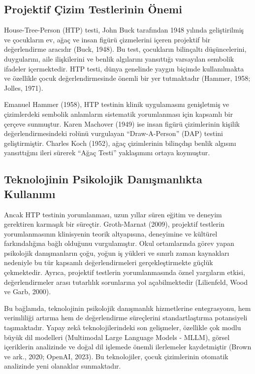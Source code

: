\subsection{Projektif Çizim Testlerinin Önemi}

House-Tree-Person (HTP) testi, John Buck tarafından 1948 yılında geliştirilmiş ve çocukların ev, ağaç ve insan figürü çizmelerini içeren projektif bir değerlendirme aracıdır (Buck, 1948). Bu test, çocukların bilinçaltı düşüncelerini, duygularını, aile ilişkilerini ve benlik algılarını yansıttığı varsayılan sembolik ifadeler içermektedir. HTP testi, dünya genelinde yaygın biçimde kullanılmakta ve özellikle çocuk değerlendirmesinde önemli bir yer tutmaktadır (Hammer, 1958; Jolles, 1971).

Emanuel Hammer (1958), HTP testinin klinik uygulamasını genişletmiş ve çizimlerdeki sembolik anlamların sistematik yorumlanması için kapsamlı bir çerçeve sunmuştur. Karen Machover (1949) ise insan figürü çizimlerinin kişilik değerlendirmesindeki rolünü vurgulayan ``Draw-A-Person'' (DAP) testini geliştirmiştir. Charles Koch (1952), ağaç çizimlerinin bilinçdışı benlik algısını yansıttığını ileri sürerek ``Ağaç Testi'' yaklaşımını ortaya koymuştur.

\subsection{Teknolojinin Psikolojik Danışmanlıkta Kullanımı}

Ancak HTP testinin yorumlanması, uzun yıllar süren eğitim ve deneyim gerektiren karmaşık bir süreçtir. Groth-Marnat (2009), projektif testlerin yorumlanmasının klinisyenin teorik altyapısına, deneyimine ve kültürel farkındalığına bağlı olduğunu vurgulamıştır. Okul ortamlarında görev yapan psikolojik danışmanların çoğu, yoğun iş yükleri ve sınırlı zaman kaynakları nedeniyle bu tür kapsamlı değerlendirmeleri gerçekleştirmekte güçlük çekmektedir. Ayrıca, projektif testlerin yorumlanmasında öznel yargıların etkisi, değerlendirmeler arası tutarlılık sorunlarına yol açabilmektedir (Lilienfeld, Wood ve Garb, 2000).

Bu bağlamda, teknolojinin psikolojik danışmanlık hizmetlerine entegrasyonu, hem verimliliği artırma hem de değerlendirme süreçlerini standartlaştırma potansiyeli taşımaktadır. Yapay zekâ teknolojilerindeki son gelişmeler, özellikle çok modlu büyük dil modelleri (Multimodal Large Language Models - MLLM), görsel içeriklerin analizinde ve doğal dil işlemede önemli ilerlemeler kaydetmiştir (Brown ve ark., 2020; OpenAI, 2023). Bu teknolojiler, çocuk çizimlerinin otomatik analizinde yeni olanaklar sunmaktadır.

